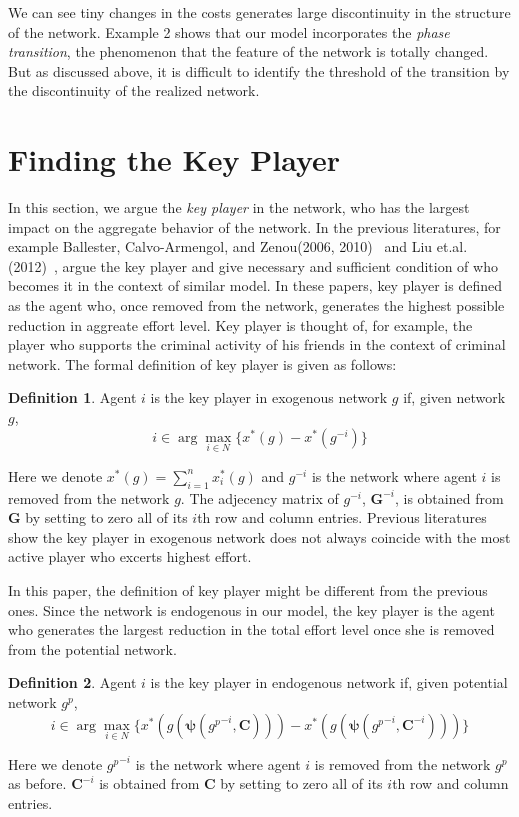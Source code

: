 \documentclass[12pt]{article}
\theoremstyle{definition}
\newtheorem{definition}{Definition}
\begin{document}
We can see tiny changes in the costs generates large discontinuity in the structure of the network.
Example 2 shows that our model incorporates the {\it{phase transition}}, the phenomenon that the feature of the network is totally changed.
But as discussed above, it is difficult to identify the threshold of the transition by the discontinuity of the realized network.


\section{Finding the Key Player}

In this section, we argue the {\it{key player}} in the network, who has the largest impact on the aggregate behavior of the network.
In the previous literatures, for example Ballester, Calvo-Armengol, and Zenou(2006, 2010)~\cite{whowho, delinquent} and Liu et.al.(2012)~\cite{criminal}, argue the key player and give necessary and sufficient condition of who becomes it in the context of similar model.
In these papers, key player is defined as the agent who, once removed from the network, generates the highest possible reduction in aggreate effort level.
Key player is thought of, for example, the player who supports the criminal activity of his friends in the context of criminal network.
The formal definition of key player is given as follows:

\begin{definition}
Agent $i$ is the key player in exogenous network $g$ if, given network $g$,
\[ i \in \arg \max_{i \in N} \{ x^*(g) - x^*(g^{-i}) \} \]
\end{definition}

Here we denote $x^*(g) = \sum_{i=1}^n x_i^*(g)$ and $g^{-i}$ is the network where agent $i$ is removed from the network $g$.
The adjecency matrix of $g^{-i}$, $\bm{G}^{-i}$, is obtained from $\bm{G}$ by setting to zero all of its $i$th row and column entries.
Previous literatures show the key player in exogenous network does not always coincide with the most active player who excerts highest effort.

In this paper, the definition of key player might be different from the previous ones.
Since the network is endogenous in our model, the key player is the agent who generates the largest reduction in the total effort level once she is removed from the potential network.

\begin{definition}
Agent $i$ is the key player in endogenous network if, given potential network $g^p$,
\[ i \in \arg \max_{i \in N} \{ x^*(g(\bm{\psi}({g^p}^{-i}, \bm{C}))) - x^*(g(\bm{\psi}({g^p}^{-i}, \bm{C}^{-i}))) \} \]
\end{definition}
Here we denote ${g^p}^{-i}$ is the network where agent $i$ is removed from the network $g^p$ as before.
$\bm{C}^{-i}$ is obtained from $\bm{C}$ by setting to zero all of its $i$th row and column entries.
\end{document}
